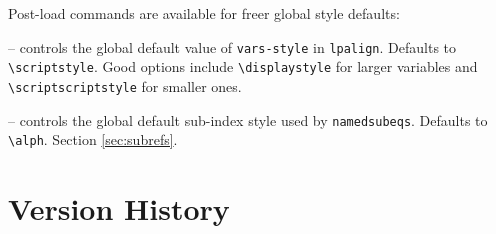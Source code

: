 \documentclass{article}
\begin{document}
\noindent Post-load commands are available for freer global style defaults:
		\begin{compactitem}
		\item[\texttt{\char`\\}\Verb|setvarsstyle|] -- controls the global default value of \verb|vars-style| in \verb|lpalign|. Defaults to \verb|\scriptstyle|. Good options include \verb|\displaystyle| for larger variables and \verb|\scriptscriptstyle| for smaller ones.
		\item[\texttt{\char`\\}\Verb|setnamedsubeqstyle|] -- controls the global default sub-index style used by \verb|namedsubeqs|. Defaults to \verb|\alph|. Section \ref{sec:subrefs}.
		\end{compactitem}


\section{Version History}
\end{document}
